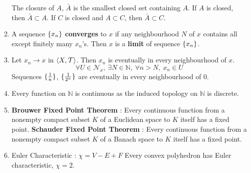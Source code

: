 \begin{enumerate}
		\subitem The closure of $A$, $\bar{A}$ is the smallest closed set containing $A$.
		\subitem If $A$ is closed, then $\bar{A} \subset A$.
		\subitem If $C$ is closed and $A \subset C$, then $\bar{A} \subset C$.
	\item A sequence $\{x_n\}$ \textbf{converges} to $x$ if any neighbourhood $N$ of $x$ contains all except finitely many $x_n$'s.
	Then $x$ is a \textbf{limit} of sequence $\{x_n\}$.
	\item Let $x_n \to x$ in $\left\langle X,\mathcal{T} \right\rangle$.
	Then $x_n$ is eventually in every neighbourhood of $x$.
	$$ \forall U \in \mathcal{N}_x,\ \exists N \in \mathbb{N},\ \forall n > N,\ x_n \in U $$
	\subitem Sequences $\{\frac{1}{n}\}$, $\{\frac{1}{2^n}\}$ are eventually in every neighbourhood of $0$.
	\item Every function on $\mathbb{N}$ is continuous as the induced topology on $\mathbb{N}$ is discrete.
	\item \textbf{Brouwer Fixed Point Theorem} : Every continuous function from a nonempty compact subset $K$ of a Euclidean space to $K$ itself has a fixed point.
		\subitem \textbf{Schauder Fixed Point Theorem} : Every continuous function from a nonempty compact subset $K$ of a Banach space to $K$ itself has a fixed point.
	\item Euler Characteristic : $\chi = V - E + F$
		\subitem Every convex polyhedron has Euler characteristic, $\chi = 2$.
\end{enumerate}
